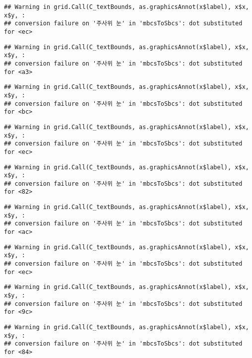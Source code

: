 \documentclass[]{book}
\begin{document}
\begin{verbatim}
## Warning in grid.Call(C_textBounds, as.graphicsAnnot(x$label), x$x, x$y, :
## conversion failure on '주사위 눈' in 'mbcsToSbcs': dot substituted for <ec>
\end{verbatim}

\begin{verbatim}
## Warning in grid.Call(C_textBounds, as.graphicsAnnot(x$label), x$x, x$y, :
## conversion failure on '주사위 눈' in 'mbcsToSbcs': dot substituted for <a3>
\end{verbatim}

\begin{verbatim}
## Warning in grid.Call(C_textBounds, as.graphicsAnnot(x$label), x$x, x$y, :
## conversion failure on '주사위 눈' in 'mbcsToSbcs': dot substituted for <bc>
\end{verbatim}

\begin{verbatim}
## Warning in grid.Call(C_textBounds, as.graphicsAnnot(x$label), x$x, x$y, :
## conversion failure on '주사위 눈' in 'mbcsToSbcs': dot substituted for <ec>
\end{verbatim}

\begin{verbatim}
## Warning in grid.Call(C_textBounds, as.graphicsAnnot(x$label), x$x, x$y, :
## conversion failure on '주사위 눈' in 'mbcsToSbcs': dot substituted for <82>
\end{verbatim}

\begin{verbatim}
## Warning in grid.Call(C_textBounds, as.graphicsAnnot(x$label), x$x, x$y, :
## conversion failure on '주사위 눈' in 'mbcsToSbcs': dot substituted for <ac>
\end{verbatim}

\begin{verbatim}
## Warning in grid.Call(C_textBounds, as.graphicsAnnot(x$label), x$x, x$y, :
## conversion failure on '주사위 눈' in 'mbcsToSbcs': dot substituted for <ec>
\end{verbatim}

\begin{verbatim}
## Warning in grid.Call(C_textBounds, as.graphicsAnnot(x$label), x$x, x$y, :
## conversion failure on '주사위 눈' in 'mbcsToSbcs': dot substituted for <9c>
\end{verbatim}

\begin{verbatim}
## Warning in grid.Call(C_textBounds, as.graphicsAnnot(x$label), x$x, x$y, :
## conversion failure on '주사위 눈' in 'mbcsToSbcs': dot substituted for <84>
\end{verbatim}
\end{document}
